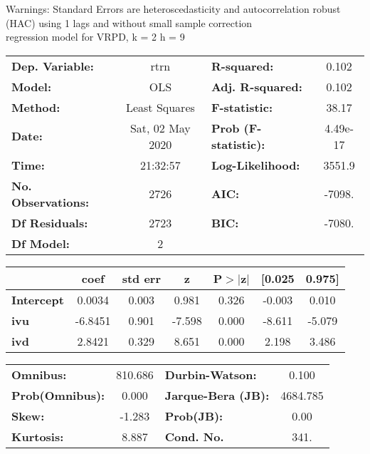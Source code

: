 Warnings: \newline
 [1] Standard Errors are heteroscedasticity and autocorrelation robust (HAC) using 1 lags and without small sample correction\\ 

regression model for VRPD, k = 2 h = 9\begin{center}
\begin{tabular}{lclc}
\toprule
\textbf{Dep. Variable:}    &       rtrn       & \textbf{  R-squared:         } &     0.102   \\
\textbf{Model:}            &       OLS        & \textbf{  Adj. R-squared:    } &     0.102   \\
\textbf{Method:}           &  Least Squares   & \textbf{  F-statistic:       } &     38.17   \\
\textbf{Date:}             & Sat, 02 May 2020 & \textbf{  Prob (F-statistic):} &  4.49e-17   \\
\textbf{Time:}             &     21:32:57     & \textbf{  Log-Likelihood:    } &    3551.9   \\
\textbf{No. Observations:} &        2726      & \textbf{  AIC:               } &    -7098.   \\
\textbf{Df Residuals:}     &        2723      & \textbf{  BIC:               } &    -7080.   \\
\textbf{Df Model:}         &           2      & \textbf{                     } &             \\
\bottomrule
\end{tabular}
\begin{tabular}{lcccccc}
                   & \textbf{coef} & \textbf{std err} & \textbf{z} & \textbf{P$> |$z$|$} & \textbf{[0.025} & \textbf{0.975]}  \\
\midrule
\textbf{Intercept} &       0.0034  &        0.003     &     0.981  &         0.326        &       -0.003    &        0.010     \\
\textbf{ivu}       &      -6.8451  &        0.901     &    -7.598  &         0.000        &       -8.611    &       -5.079     \\
\textbf{ivd}       &       2.8421  &        0.329     &     8.651  &         0.000        &        2.198    &        3.486     \\
\bottomrule
\end{tabular}
\begin{tabular}{lclc}
\textbf{Omnibus:}       & 810.686 & \textbf{  Durbin-Watson:     } &    0.100  \\
\textbf{Prob(Omnibus):} &   0.000 & \textbf{  Jarque-Bera (JB):  } & 4684.785  \\
\textbf{Skew:}          &  -1.283 & \textbf{  Prob(JB):          } &     0.00  \\
\textbf{Kurtosis:}      &   8.887 & \textbf{  Cond. No.          } &     341.  \\
\bottomrule
\end{tabular}
\end{center}

